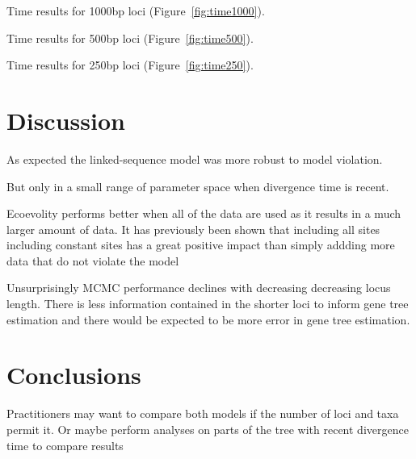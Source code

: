 Time results for 1000bp loci (Figure~\ref{fig:time1000}).

Time results for 500bp loci (Figure~\ref{fig:time500}).

Time results for 250bp loci (Figure~\ref{fig:time250}).

\section{Discussion}

As expected the linked-sequence model was more robust to model violation.

But only in a small range of parameter space when divergence time is recent.

Ecoevolity performs better when all of the data are used as it results in a much larger 
amount of data. It has previously been shown that including all sites including 
constant sites has a great positive impact than simply addding more data that 
do not violate the model \citep{Oaks2018ecoevolity}

Unsurprisingly MCMC performance declines with decreasing decreasing locus length.
There is less information contained in the shorter loci to inform gene tree estimation 
and there would be expected to be more error in gene tree estimation.




\section{Conclusions}

Practitioners may want to compare both models if the number of loci and taxa
permit it. Or maybe perform analyses on parts of the tree with recent divergence
time to compare results 